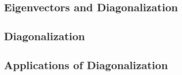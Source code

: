 \subsection{Eigenvectors and Diagonalization}


\subsection{Diagonalization}


\subsection{Applications of Diagonalization}




\newpage